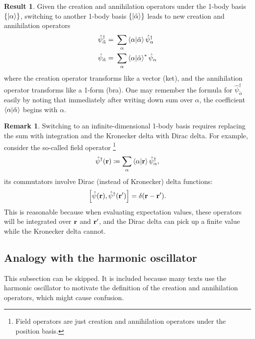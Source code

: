 \documentclass{article}
\theoremstyle{definition}
\newtheorem{res}[mot]{Result}
\newtheorem{rem}[mot]{Remark}
\numberwithin{equation}{section}
\begin{document}
\begin{graybox}
\begin{res}
    Given the creation and annihilation operators 
    under the 1-body basis $\{\ket{\alpha}\}$, 
    switching to another 1-body basis 
    $\{\ket{\tilde{\alpha}}\}$ leads to new 
    creation and annihilation operators 
    \begin{align*}
    \hat{\psi}^{\dagger}_{\tilde{\alpha}}
    =&\ 
    \sum_{\alpha}\bra{\alpha}\ket{\tilde{\alpha}}
    \hat{\psi}^{\dagger}_{\alpha} \\
    \hat{\psi}_{\tilde{\alpha}}
    =&\ 
    \sum_{\alpha}\bra{\alpha}\ket{\tilde{\alpha}} ^{*} \hat{\psi}_{\alpha}
    \end{align*}
    where the creation operator 
    transforms like a vector (ket), 
    and the annihilation operator 
    transforms like a 1-form (bra). 
    One may remember the formula for 
    $\hat{\psi}^{\dagger}_{\tilde{\alpha}}$ easily by noting that 
    immediately after writing down sum over $\alpha$, 
    the coefficient $\bra{\alpha}\ket{\tilde{\alpha}}$ 
    begins with $\alpha$.
\end{res}
\end{graybox}

\begin{rem}
    Switching to an infinite-dimensional 1-body basis 
    requires replacing the sum 
    with integration and 
    the Kronecker delta with 
    Dirac delta. 
    For example, 
    consider the so-called field operator
    \footnote{
        Field operators are just creation and annihilation operators 
        under the position basis.
    }
    \[
        \hat{\psi}^{\dagger}(\vb{r})
        \coloneqq
        \sum_{\alpha}\bra{\alpha}\ket{\vb{r}}
        \hat{\psi}^{\dagger}_{\alpha},
    \]
    its commutators involve Dirac (instead of Kronecker) delta functions: 
    \[
        \comm{\hat{\psi}(\vb{r})}{\hat{\psi}^{\dagger}(\vb{r'})}
        =
        \delta(\vb{r}-\vb{r'}).
    \]
    This is reasonable because 
    when evaluating expectation values, 
    these operators will be integrated over $\vb{r}$ and $\vb{r'}$, and 
    the Dirac delta can pick up a finite value while 
    the Kronecker delta cannot.
\end{rem}

\subsection{Analogy with the harmonic oscillator}

This subsection 
can be skipped. 
It is included because many texts use the 
harmonic oscillator to motivate the definition of 
the creation and annihilation operators, which 
might cause confusion.
\end{document}
